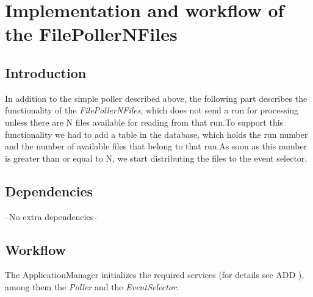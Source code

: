 \section{Implementation and workflow of the FilePollerNFiles}\label{sec:ImplementationN}

\subsection{\textbf{Introduction}}
In addition to the simple poller described above, the following part describes the functionality of the \textit{FilePollerNFiles}, which does not send a run for processing unless there are N files available for reading from that run.To support this functionality we had to add a table in the database, which holds the run number and the number of available files that belong to that run.As soon as this number is greater than or equal to N, we start distributing the files to the event selector.\par

\subsection{\textbf{Dependencies}}
--No extra dependencies--

\subsection{\textbf{Workflow}}
The ApplicationManager initializes the required services (for details see ADD \cite{mato1998gaudi}), among them the \textit{Poller} and the \textit{EventSelector}.\par

